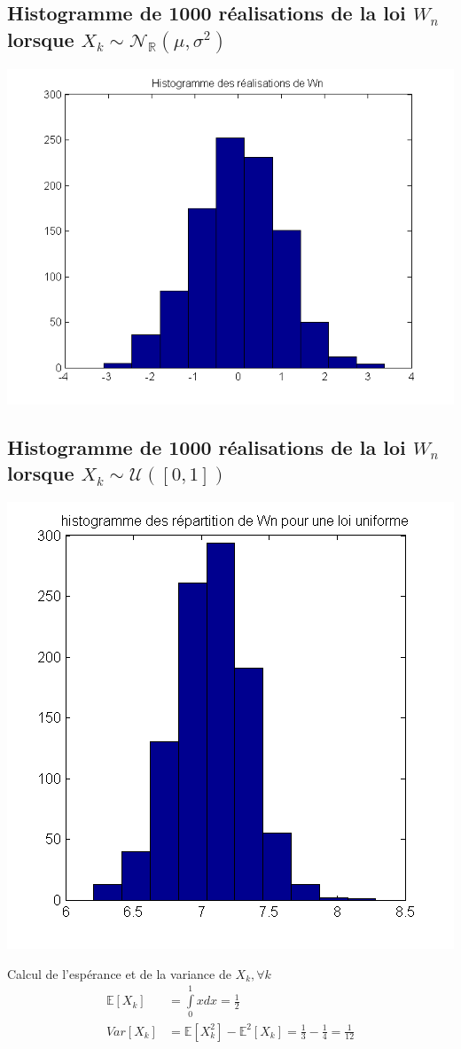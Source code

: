 \documentclass{report}
\begin{document}
		\subsection{Histogramme de 1000 réalisations de la loi $W_n$ lorsque $X_k \sim \mathcal{N}_{\mathbb{R}}(\mu, \sigma^2)$}
			\includegraphics[scale=0.7]{sources/Q241.png}
		\subsection{Histogramme de 1000 réalisations de la loi $W_n$ lorsque $X_k \sim \mathcal{U}([0,1])$}
			\begin{center}
				\includegraphics[scale=0.7]{sources/Q242-1.png}
			\end{center}
		Calcul de l'espérance et de la variance de $X_k, \forall k$
		\begin{align*}
			\mathbb{E}[X_k] &= \int\limits_0^1 x dx = \frac{1}{2}\\
			Var[X_k] &= \mathbb{E}[X_k^2] - \mathbb{E}^2[X_k] = \frac{1}{3} - \frac{1}{4} = \frac{1}{12}
		\end{align*}
\end{document}
